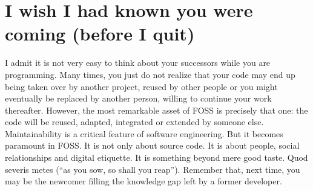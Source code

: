 \section*{I wish I had known you were coming (before I quit)}

I admit it is not very easy to think about your successors while you are programming. Many times, you just do not realize that your code may end up being taken over by another project, reused by other people or you might eventually be replaced by another person, willing to continue your work thereafter.
However, the most remarkable asset of FOSS is precisely that one: the code will be reused, adapted, integrated or extended by someone else. Maintainability is a critical feature of software engineering. But it becomes paramount in FOSS. It is not only about source code. It is about people, social relationships and digital etiquette. It is something beyond mere good taste. Quod severis metes (“as you sow, so shall you reap”). Remember that, next time, you may be the newcomer filling the knowledge gap left by a former developer.
